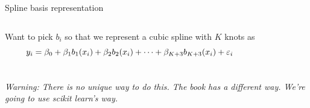\documentclass[aspectratio=169,usenames,dvipsnames]{beamer}
\newcommand{\InstructorNotes}[1]{\textit{\color{orange}#1}}
\newcommand{\InstructorList}[1]{
\begin{itemize}
	\color{orange}
	#1
\end{itemize}
}
\begin{document}




\begin{frame}[c]{Spline basis representation}

\begin{columns}
\centering
Want to pick $b_i$ so that we represent a cubic spline with $K$ knots as
\begin{equation*}
	y_i = \beta_0 + \beta_1b_1(x_i) + \beta_2 b_2(x_i) + \cdots + \beta_{K+3} b_{K+3}(x_i) + \varepsilon_i
\end{equation*}
\end{columns}

\InstructorNotes{Warning: There is no unique way to do this. The book has a different way. We're going to use scikit learn's way.}

\end{frame}
\end{document}
